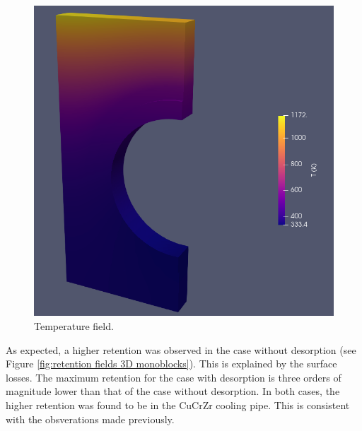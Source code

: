\begin{figure}
    \centering
    \includegraphics[width=\linewidth]{Figures/Chapter3/monoblocks/3D_monoblocks/temperature_3D_monoblock.png}
    \caption{Temperature field.}
    \label{fig: T field 3D monoblock}
\end{figure}


As expected, a higher retention was observed in the case without desorption (see Figure \ref{fig:retention fields 3D monoblocks}).
This is explained by the surface losses.
The maximum retention for the case with desorption is three orders of magnitude lower than that of the case without desorption.
In both cases, the higher retention was found to be in the CuCrZr cooling pipe.
This is consistent with the obsverations made previously.

